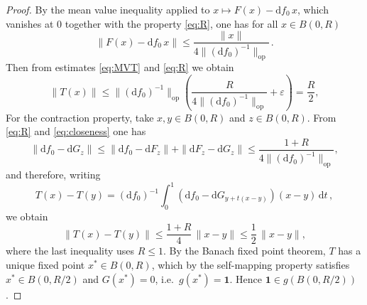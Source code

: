 \documentclass[10pt,a4paper]{amsart}
\begin{document}
\begin{proof}
By the mean value inequality applied to $x\mapsto F(x)-\mathrm{d}f_0\,x$, which vanishes at $0$ together with  the property \eqref{eq:R}, one has for all $x\in B(0,R)$
\begin{equation}\label{eq:MVT}
    \|F(x) - \mathrm{d}f_0\,x\| \leq \frac{\|x\|}{4\|(\mathrm{d}f_0)^{-1}\|_{\text{op}}}\,.
\end{equation}
Then from estimates \eqref{eq:MVT} and \eqref{eq:R} we obtain
\[
    \|T(x)\| \leq \|(\mathrm{d}f_0)^{-1}\|_{\text{op}}\!\left(\frac{R}{4\|(\mathrm{d}f_0)^{-1}\|_{\text{op}}}
    + \varepsilon\right) = \frac{R}{2},
\]
For the contraction property, take  $x,y\in B(0,R) $ and $z\in B(0,R)$. From  \eqref{eq:R} and \eqref{eq:closeness} one has
\[
    \|\mathrm{d}f_0 - \mathrm{d}G_z\|
    \leq \|\mathrm{d}f_0 - \mathrm{d}F_z\| + \|\mathrm{d}F_z-\mathrm{d}G_z\|
    \leq \frac{1+R}{4\|(\mathrm{d}f_0)^{-1}\|_{\text{op}}},
\]
and therefore, writing \[T(x)-T(y) = (\mathrm{d}f_0)^{-1}\int_0^1(\mathrm{d}f_0 -
\mathrm{d}G_{y+t(x-y)})(x-y)\,\mathrm{d}t\,,\]
we obtain
\[
    \|T(x)-T(y)\| \leq \frac{1+R}{4}\,\|x-y\| \leq \frac{1}{2}\,\|x-y\|,
\]
where the last inequality uses $R\leq 1$. By the Banach fixed point theorem, $T$ has a
unique fixed point $x^*\in B(0,R) $, which by the self-mapping property satisfies $x^*\in B(0,R/2)$ and $G(x^*)=0$, i.e.\ $g(x^*)=\mathbf{1}$.
Hence $\mathbf{1}\in g(B(0,R/2))$.
\end{proof}
\end{document}
